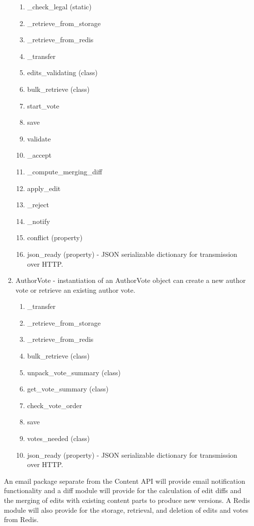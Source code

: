 \documentclass[12pt,letterpaper]{article}
\begin{document}
\begin{enumerate}
\begin{enumerate}
\item[] \_check\_legal (static)
\item[] \_retrieve\_from\_storage
\item[] \_retrieve\_from\_redis
\item[] \_transfer
\item[] edits\_validating (class)
\item[] bulk\_retrieve (class)
\item[] start\_vote
\item[] save
\item[] validate
\item[] \_accept
\item[] \_compute\_merging\_diff
\item[] apply\_edit
\item[] \_reject
\item[] \_notify
\item[] conflict (property)
\item[] json\_ready (property) - JSON serializable dictionary for transmission over HTTP.
\end{enumerate}
\item[] AuthorVote - instantiation of an AuthorVote object can create a new author vote or retrieve an existing author vote.
\begin{enumerate}
\item[] \_transfer
\item[] \_retrieve\_from\_storage
\item[] \_retrieve\_from\_redis
\item[] bulk\_retrieve (class)
\item[] unpack\_vote\_summary (class)
\item[] get\_vote\_summary (class)
\item[] check\_vote\_order
\item[] save
\item[] votes\_needed (class)
\item[] json\_ready (property) - JSON serializable dictionary for transmission over HTTP.
\end{enumerate}
\end{enumerate}

An email package separate from the Content API will provide email notification functionality and a diff module will provide for the calculation of edit diffs and the merging of edits with existing content parts to produce new versions. A Redis module will also provide for the storage, retrieval, and deletion of edits and votes from Redis.
\end{document}
